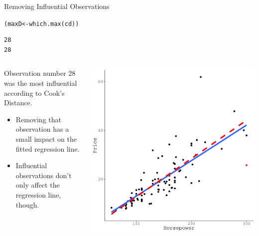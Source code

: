 \documentclass[10pt]{beamer}\usepackage[]{graphicx}\usepackage[]{color}
\makeatletter
\def\maxwidth{ %
  \ifdim\Gin@nat@width>\linewidth
    \linewidth
  \else
    \Gin@nat@width
  \fi
}
\newcommand{\hlstd}[1]{\textcolor[rgb]{0,0,0}{#1}}%
\newcommand{\hlkwb}[1]{\textcolor[rgb]{0,0.341,0.682}{#1}}%
\newcommand{\hlkwd}[1]{\textcolor[rgb]{0.004,0.004,0.506}{#1}}%
\newenvironment{kframe}{%
 \def\at@end@of@kframe{}%
 \ifinner\ifhmode%
  \def\at@end@of@kframe{\end{minipage}}%
  \begin{minipage}{\columnwidth}%
 \fi\fi%
 \def\FrameCommand##1{\hskip\@totalleftmargin \hskip-\fboxsep
 \colorbox{shadecolor}{##1}\hskip-\fboxsep
     \hskip-\linewidth \hskip-\@totalleftmargin \hskip\columnwidth}%
 \MakeFramed {\advance\hsize-\width
   \@totalleftmargin\z@ \linewidth\hsize
   \@setminipage}}%
 {\par\unskip\endMakeFramed%
 \at@end@of@kframe}
\newenvironment{knitrout}{}{} %
\makeatother
\begin{document}

\begin{frame}[fragile]{Removing Influential Observations}

\begin{knitrout}\footnotesize
{}\color{fgcolor}\begin{kframe}
\begin{alltt}
\hlstd{(maxD} \hlkwb{<-} \hlkwd{which.max}\hlstd{(cd))}
\end{alltt}
\begin{verbatim}
28 
28 
\end{verbatim}
\end{kframe}
\end{knitrout}

  \begin{columns}
    \begin{column}{0.5\textwidth}

      Observation number 28 was the most influential
      according to Cook's Distance.
      \vb
      \begin{itemize}
      \item Removing that observation has a small impact on the fitted
        regression line.
        \vc
      \item Influential observations don't only affect the regression line,
        though.
      \end{itemize}

    \end{column}

    \begin{column}{0.5\textwidth}

\begin{knitrout}\footnotesize
{}\color{fgcolor}

{\centering \includegraphics[width=\maxwidth]{figure/assumptions-unnamed-chunk-33-1} 

}
\end{knitrout}
\end{column}
\end{columns}
\end{frame}
\end{document}
